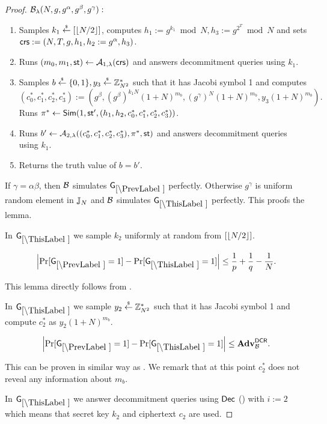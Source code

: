 \begin{proof}
$\mathcal{B}_{\lambda}(N,g,g^\alpha, g^\beta, g^\gamma):$
\vspace{-2mm}
\begin{enumerate}
\item Samples $k_1 \stackrel{{\scriptscriptstyle\$}}{\leftarrow} [\left\lfloor N/2 \right\rfloor]$, computes $h_1 := g^{k_1} \bmod N,  h_3 := g^{2^{T}} \bmod N$ and sets $\mathsf{crs}:=(N, T, g, h_1, h_2:=g^\alpha, h_3)$.
\item Runs $(m_0, m_1, \mathsf{st}) \leftarrow \mathcal{A}_{1, \lambda}(\mathsf{crs})$ and answers decommitment queries using $k_1$.
\item Samples $b \stackrel{{\scriptscriptstyle\$}}{\leftarrow} \{0,1\}, y_3 \stackrel{{\scriptscriptstyle\$}}{\leftarrow} \mathbb{Z}_{N^2}^*$ such that it has Jacobi symbol 1 and computes $(c_0^*, c_1^*, c_2^*, c_3^*):=(g^\beta, (g^\beta)^{k_1 N}(1+N)^{m_b}, (g^{\gamma})^N(1+N)^{m_b}, y_3(1+N)^{m_b}).$ Runs $\pi^* \leftarrow \mathsf{Sim}(1, \mathsf{st}', (h_1, h_2, c_0^*, c_1^*, c_2^*, c_3^*))$.
\item Runs $b' \leftarrow \mathcal{A}_{2, \lambda}((c_0^*, c_1^*, c_2^*,c_3^*), \pi^*, \mathsf{st})$ and answers decommitment queries using $k_1$.
\item Returns the truth value of $b=b'$.
\end{enumerate}
If $\gamma = \alpha\beta$, then $\mathcal{B}$ simulates $\games_\prevgame$ perfectly. Otherwise $g^\gamma$ is uniform random element in $\mathbb{J}_N$ and $\mathcal{B}$ simulates $\games_\thisgame$ perfectly. This proofs the lemma.

In $\games_\thisgame$ we sample $k_2$ uniformly at random from $[\left\lfloor N/2 \right\rfloor]$. 

\begin{lemma}
\[
\left|\Pr[\games_\prevgame = 1] - \Pr[\games_\thisgame = 1]\right| \leq \frac{1}{p}+\frac{1}{q}-\frac{1}{N}.
\]
\end{lemma}

This lemma directly follows from .

In $\games_\thisgame$ we sample $y_2 \stackrel{{\scriptscriptstyle\$}}{\leftarrow} \mathbb{Z}_{N^2}^*$ such that it has Jacobi symbol 1 and compute $c_2^*$ as $y_2(1+N)^{m_b}$. 

\begin{lemma}
\[
\left|\Pr[\games_\prevgame = 1] - \Pr[\games_\thisgame = 1]\right| \leq \advtg_\advB^\dcr.
\]
\end{lemma}
This can be proven in similar way as . We remark that at this point $c_2^*$ does not reveal any information about $m_b$.




In $\games_\thisgame$ we answer decommitment queries using $\mathsf{Dec}$ () with $i:=2$ which means that secret key $k_2$ and ciphertext $c_2$ are used. 


\end{proof}
